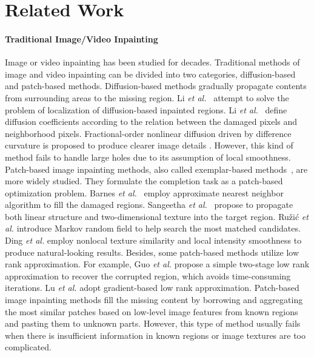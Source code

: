 




\section{Related Work}
\paragraph{Traditional Image/Video Inpainting} Image or video inpainting has been studied for decades. 
%
Traditional methods of image and video inpainting can be divided into two categories, diffusion-based and patch-based methods. 
Diffusion-based methods \cite{bertalmio2000image,ballester2001filling} gradually propagate contents from surrounding areas to the missing region. 
Li \emph{et al.}~\cite{li2017localization} attempt to solve the problem of localization of diffusion-based inpainted regions.
Li \emph{et al.}~\cite{li2016image} define diffusion coefficients according to the relation between the damaged pixels and neighborhood pixels.
Fractional-order nonlinear diffusion driven by difference curvature is proposed to produce clearer image details \cite{sridevi2019image}. 
However, this kind of method fails to handle large holes due to its assumption of local smoothness. 
%
Patch-based image inpainting methods, also called exemplar-based methods~\cite{bertalmio2003simultaneous,efros2001image}, are more widely studied.
They formulate the completion task as a patch-based optimization problem. 
Barnes \emph{et al.}~\cite{barnes2009patchmatch} employ approximate nearest neighbor algorithm to fill the damaged regions.
Sangeetha \emph{et al.}~\cite{sangeetha2011combined} propose to propagate both linear structure and two-dimensional texture into the target region.
Ru{\v{z}}i{\'c} \emph{et al.} \cite{ruvzic2014context} introduce Markov random field to help search the most matched candidates.
Ding \emph{et al.} \cite{ding_19nonlocal} employ nonlocal texture similarity and local intensity smoothness to produce natural-looking results.
Besides, some patch-based methods utilize low rank approximation. For example, Guo \emph{et al.} \cite{pb_lowrank2018} propose a simple two-stage low rank approximation to recover the corrupted region, which avoids time-consuming iterations.
Lu \emph{et al.} \cite{lu2018gradient} adopt gradient-based low rank approximation.
Patch-based image inpainting methods fill the missing content by borrowing and aggregating the most similar patches based on low-level image features from known regions and pasting them to unknown parts. However, this type of method usually fails when there is insufficient information in known regions or image textures are too complicated.  
%

